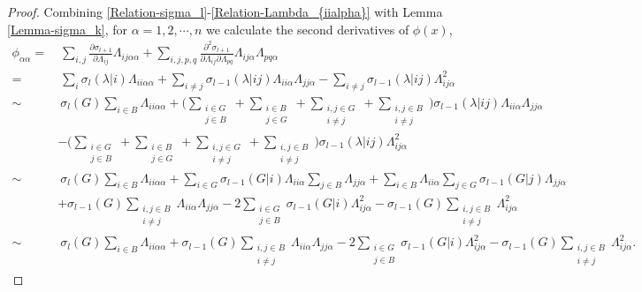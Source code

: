 \documentclass[11pt]{amsart}
\numberwithin{theorem}{section}
\numberwithin{equation}{section}
\begin{document}
\begin{proof}
Combining \eqref{Relation-sigma_l}-\eqref{Relation-Lambda_{iialpha}} with Lemma \ref{Lemma-sigma_k}, for $\alpha=1,2,\cdots,n$ we calculate the second derivatives of $\phi(x)$,
\begin{align*}
\phi_{\alpha\alpha}
=&~\sum_{i,j}\frac{\partial\sigma_{l+1}}{\partial \Lambda_{ij}}\Lambda_{ij\alpha\alpha}+\sum_{i,j,p,q}\frac{\partial^2\sigma_{l+1}}{\partial \Lambda_{ij}\partial \Lambda_{pq}}\Lambda_{ij\alpha}\Lambda_{pq\alpha}\\
=&~\sum_i\sigma_l(\lambda|i)\Lambda_{ii\alpha\alpha}+\sum_{i\neq j}\sigma_{l-1}(\lambda|ij)\Lambda_{ii\alpha}\Lambda_{jj\alpha}-\sum_{i\neq j}\sigma_{l-1}(\lambda|ij)\Lambda_{ij\alpha}^2\\
\sim&~\sigma_l(G)\sum_{i\in B}\Lambda_{ii\alpha\alpha}+\bigg(\sum_{\substack{i\in G\\ j\in B}}+\sum_{\substack{i\in B\\ j\in G}}+\sum_{\substack{i,j\in G\\ i\neq j}}+\sum_{\substack{i,j\in B\\ i\neq j}}\bigg)\sigma_{l-1}(\lambda|ij)\Lambda_{ii\alpha}\Lambda_{jj\alpha}\\
&-\bigg(\sum_{\substack{i\in G\\ j\in B}}+\sum_{\substack{i\in B\\ j\in G}}+\sum_{\substack{i,j\in G\\ i\neq j}}+\sum_{\substack{i,j\in B\\ i\neq j}}\bigg)\sigma_{l-1}(\lambda|ij)\Lambda_{ij\alpha}^2\\
\sim&~\sigma_l(G)\sum_{i\in B}\Lambda_{ii\alpha\alpha}+\sum_{i\in G}\sigma_{l-1}(G|i)\Lambda_{ii\alpha}\sum_{j\in B}\Lambda_{jj\alpha}+\sum_{i\in B}\Lambda_{ii\alpha}\sum_{j\in G}\sigma_{l-1}(G|j)\Lambda_{jj\alpha}\\
&+\sigma_{l-1}(G)\sum_{\substack{i,j\in B\\ i\neq j}}\Lambda_{ii\alpha}\Lambda_{jj\alpha}-2\sum_{\substack{i\in G\\ j\in B}}\sigma_{l-1}(G|i)\Lambda_{ij\alpha}^2-\sigma_{l-1}(G)\sum_{\substack{i,j\in B\\ i\neq j}}\Lambda_{ij\alpha}^2\\
\sim&~\sigma_l(G)\sum_{i\in B}\Lambda_{ii\alpha\alpha}+\sigma_{l-1}(G)\sum_{\substack{i,j\in B\\ i\neq j}}\Lambda_{ii\alpha}\Lambda_{jj\alpha}-2\sum_{\substack{i\in G\\ j\in B}}\sigma_{l-1}(G|i)\Lambda_{ij\alpha}^2-\sigma_{l-1}(G)\sum_{\substack{i,j\in B\\ i\neq j}}\Lambda_{ij\alpha}^2.

\end{align*}
\end{proof}
\end{document}
